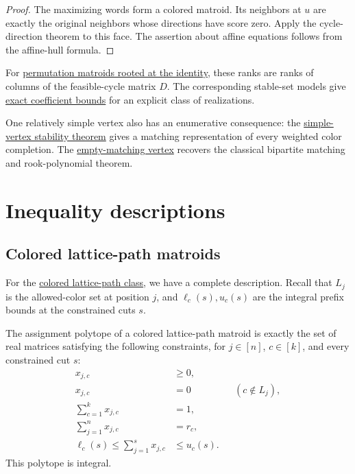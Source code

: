 \begin{proof}
The maximizing words form a colored matroid. Its neighbors at $u$
are exactly the original neighbors whose directions have score zero.
Apply the cycle-direction theorem to this face. The assertion about
affine equations follows from the affine-hull formula.
\end{proof}

For \href{permutations.htm#rootCycles}{permutation matroids rooted at
the identity}, these ranks are ranks of columns of the feasible-cycle
matrix $D$. The corresponding stable-set models give
\href{stable-sets.htm#stableSetCoefficients}{exact coefficient bounds}
for an explicit class of realizations.

One relatively simple vertex also has an enumerative consequence: the
\href{stability.htm#simpleVertexStability}{simple-vertex stability theorem}
gives a matching representation of every weighted color completion.
The \href{stability.htm#rookPolynomialCorollary}{empty-matching vertex}
recovers the classical bipartite matching and rook-polynomial theorem.

\section[polytopeDescriptions]{Inequality descriptions}

\subsection[latticePathDescription]{Colored lattice-path matroids}

For the \href{lattice-paths.htm}{colored lattice-path class}, we have a
complete description. Recall that $L_j$ is the allowed-color set at position
$j$, and $\ell_c(s),u_c(s)$ are the integral prefix bounds at the constrained
cuts $s$.

\begin{proposition}
The assignment polytope of a colored lattice-path matroid is exactly the
set of real matrices satisfying the following constraints, for $j\in[n]$,
$c\in[k]$, and every constrained cut $s$:
\[
\begin{aligned}
 x_{j,c}&\geq0,\\
 x_{j,c}&=0 &&(c\notin L_j),\\
 \sum_{c=1}^k x_{j,c}&=1,\\
 \sum_{j=1}^n x_{j,c}&=r_c,\\
 \ell_c(s)\leq\sum_{j=1}^s x_{j,c}&\leq u_c(s).
\end{aligned}
\]
This polytope is integral.
\end{proposition}

